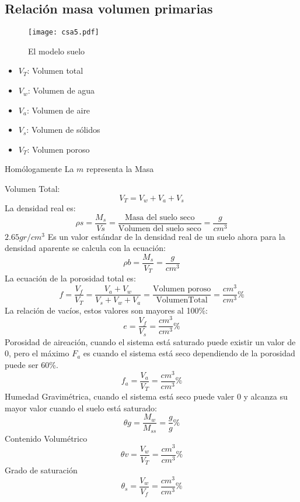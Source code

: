 \subsection{Relación masa volumen primarias}
\begin{figure}[h!]
\centering
  \texttt{[image: csa5.pdf]}
  \caption{El modelo suelo}
  \label{csa5}
\end{figure}
\begin{notation}
    \begin{itemize}
        \item $V_T$: Volumen total
        \item $V_w$: Volumen de agua
        \item $V_a$: Volumen de aire
        \item $V_s$: Volumen de sólidos
        \item $V_T$: Volumen poroso
    \end{itemize}
    Homólogamente La $m$ representa la Masa
\end{notation}
Volumen Total:
\begin{equation}
    V_T = V_w + V_a + V_s
\end{equation}
La densidad real es:
\begin{equation}
    \rho s = \frac{M_s}{Vs} = \frac{\text{Masa del suelo seco}}{\text{Volumen del suelo seco}}= \frac{g}{cm^3}
\end{equation}
$2.65gr/cm^3$ Es un valor estándar de la densidad real de un suelo ahora para la densidad aparente se calcula con la ecuación:
\begin{equation}
    \rho b = \frac{M_s}{V_T} = \frac{g}{cm^3}
\end{equation}
La ecuación de la porosidad total es:
\begin{equation}
    f = \frac{V_f}{V_T} =\frac{V_a + V_w}{V_s + V_w + V_a}= \frac{\text{Volumen poroso}}{\text{VolumenTotal}}= \frac{cm^3}{cm^3}\%
\end{equation}
La relación de vacíos, estos valores son mayores al 100\%:
\begin{equation}
    e = \frac{V_f}{V_s} = \frac{cm^3}{cm^3}\%
\end{equation}
Porosidad de aireación, cuando el sistema está saturado puede existir un valor de 0, pero el máximo $F_a$ es cuando el sistema está seco dependiendo de la porosidad puede ser 60\%.
\begin{equation}
    f_a =\frac{V_a}{V_T} = \frac{cm^3}{cm^3}\%
\end{equation}
Humedad Gravimétrica, cuando el sistema está seco puede valer 0 y alcanza su mayor valor cuando el suelo está saturado:
\begin{equation}
    \theta g = \frac{M_w}{M_{ss}} = \frac{g}{g}\%
\end{equation}
Contenido Volumétrico
\begin{equation}
    \theta v =\frac{V_w}{V_T} = \frac{cm^3}{cm^3}\%
\end{equation}
Grado de saturación
\begin{equation}
    \theta_s =\frac{V_w}{V_f} = \frac{cm^3}{cm^3}\% 
\end{equation}
